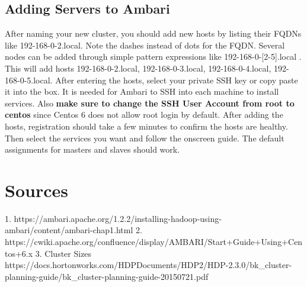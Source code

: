 \documentclass[9pt,twocolumn,twoside]{idsi}
\begin{document}
\subsection{Adding Servers to Ambari}
After naming your new cluster, you should add new hosts by listing their FQDNs like 192-168-0-2.local. Note the dashes instead of dots for the FQDN. Several nodes can be added through simple pattern expressions like 192-168-0-[2-5].local . This will add hosts 192-168-0-2.local, 192-168-0-3.local, 192-168-0-4.local, 192-168-0-5.local. After entering the hosts, select your private SSH key or copy paste it into the box. It is needed for Ambari to SSH into each machine to install services. Also \textbf{make sure to change the SSH User Account from root to centos} since Centos 6 does not allow root login by default. After adding the hosts, registration should take a few minutes to confirm the hosts are healthy. Then select the services you want and follow the onscreen guide. The default assignments for masters and slaves should work.

\section{Sources}
1. https://ambari.apache.org/1.2.2/installing-hadoop-using-ambari/content/ambari-chap1.html
2. https://cwiki.apache.org/confluence/display/AMBARI/Start+Guide+Using+Centos+6.x
3. Cluster Sizes https://docs.hortonworks.com/HDPDocuments/HDP2/HDP-2.3.0/bk_cluster-planning-guide/bk_cluster-planning-guide-20150721.pdf
\end{document}
